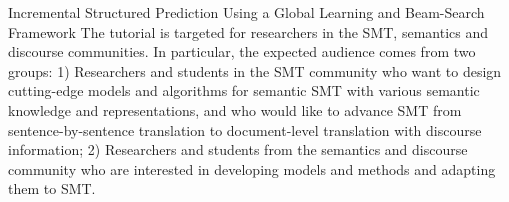 \begin{tutorial}{Incremental Structured Prediction Using a Global Learning and Beam-Search Framework}
The tutorial is targeted for researchers in the SMT, semantics and discourse communities. In particular, the expected audience comes from two groups: 1) Researchers and students in the SMT community who want to design cutting-edge models and algorithms for semantic SMT with various semantic knowledge and representations, and who would like to advance SMT from sentence-by-sentence translation to document-level translation with discourse information; 2) Researchers and students from the semantics and discourse community who are interested in developing models and methods and adapting them to SMT.

\end{tutorial}
